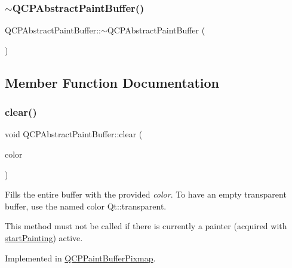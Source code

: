 \subsubsection{\texorpdfstring{$\sim$QCPAbstractPaintBuffer()}{~QCPAbstractPaintBuffer()}}
{\footnotesize\ttfamily Q\+C\+P\+Abstract\+Paint\+Buffer\+::$\sim$\+Q\+C\+P\+Abstract\+Paint\+Buffer (\begin{DoxyParamCaption}{ }\end{DoxyParamCaption})\hspace{0.3cm}{\ttfamily [virtual]}}



\subsection{Member Function Documentation}
\mbox{\label{class_q_c_p_abstract_paint_buffer_a9e253f4541dfc01992b77e8830bd7722}} 
\subsubsection{\texorpdfstring{clear()}{clear()}}
{\footnotesize\ttfamily void Q\+C\+P\+Abstract\+Paint\+Buffer\+::clear (\begin{DoxyParamCaption}\item[{const Q\+Color \&}]{color }\end{DoxyParamCaption})\hspace{0.3cm}{\ttfamily [pure virtual]}}

Fills the entire buffer with the provided {\itshape color}. To have an empty transparent buffer, use the named color {\ttfamily Qt\+::transparent}.

This method must not be called if there is currently a painter (acquired with \mbox{\hyperlink{class_q_c_p_abstract_paint_buffer_a9e9f29b19c033cf02fb96f1a148463f3}{start\+Painting}}) active. 

Implemented in \mbox{\hyperlink{class_q_c_p_paint_buffer_pixmap_a14badbd010a3cde6b55817ccb7b65217}{Q\+C\+P\+Paint\+Buffer\+Pixmap}}.

\mbox{\label{class_q_c_p_abstract_paint_buffer_aac1b981f8c1744036610ff1a6b9461f9}} 
